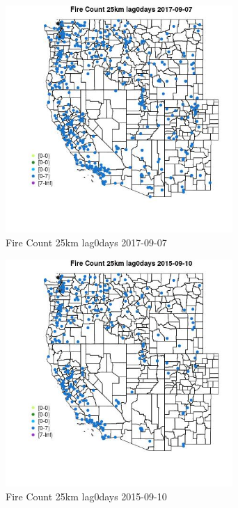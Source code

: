 \begin{figure} 
\centering  
\includegraphics[width=0.77\textwidth]{Code_Outputs/Report_ML_input_PM25_Step4_part_e_de_duplicated_aves_compiled_2019-05-20wNAs_MapObsFire_Count_25km_lag0days2017-09-07.jpg} 
\caption{\label{fig:Report_ML_input_PM25_Step4_part_e_de_duplicated_aves_compiled_2019-05-20wNAsMapObsFire_Count_25km_lag0days2017-09-07}Fire Count 25km lag0days 2017-09-07} 
\end{figure} 
 

\begin{figure} 
\centering  
\includegraphics[width=0.77\textwidth]{Code_Outputs/Report_ML_input_PM25_Step4_part_e_de_duplicated_aves_compiled_2019-05-20wNAs_MapObsFire_Count_25km_lag0days2015-09-10.jpg} 
\caption{\label{fig:Report_ML_input_PM25_Step4_part_e_de_duplicated_aves_compiled_2019-05-20wNAsMapObsFire_Count_25km_lag0days2015-09-10}Fire Count 25km lag0days 2015-09-10} 
\end{figure} 
 

